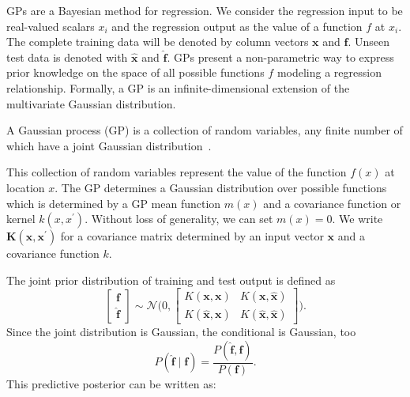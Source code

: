 \ac{GP}s are a Bayesian method for regression. We consider the regression input to be real-valued scalars $x_i$ and the regression output as the value of a function $f$ at $x_i$. The complete training data will be denoted by column vectors $\mathbf{x}$ and $\mathbf{f}$. Unseen test data is denoted with $\mathbf{\hat{x}}$ and $\mathbf{\hat{f}}$.
\ac{GP}s present a non-parametric way to express prior knowledge on the space of all possible functions $f$ modeling
a regression relationship.
Formally, a GP is an infinite-dimensional extension of the multivariate Gaussian distribution.
\begin{definition}
A Gaussian process (GP) is a collection of random variables, any
finite number of which have a joint Gaussian distribution~\citep[][chapter 2]{rasmussen2006gaussian}.
\end{definition}
This collection of random variables represent the value of the function $f(x)$ at location $x$.
The \ac{GP} determines a Gaussian distribution over possible functions 
which is determined by a \ac{GP} mean function $m(x)$ and a covariance function or kernel $k(x,x^\prime)$.
Without loss of generality, we can set $m(x)=0$. We write $\mathbf{K}(\mathbf{x},\mathbf{x}^\prime)$
for a covariance matrix determined by an input vector $\mathbf{x}$ and a covariance function $k$.
 


The joint prior distribution of training and test output is defined as 
\begin{equation}
\begin{bmatrix}
\mathbf{f} \\ 
\mathbf{\hat{f}}
\end{bmatrix}
\sim \mathcal{N}\bigg(
0,
\begin{bmatrix}
K(\mathbf{x},\mathbf{x})& K(\mathbf{x},\mathbf{\hat{x}})\\ 
K(\mathbf{\hat{x}},\mathbf{x})& K(\mathbf{\hat{x}},\mathbf{\hat{x}})
\end{bmatrix}
\bigg).
\end{equation}
Since the joint distribution is Gaussian, the conditional is Gaussian, too
\begin{equation}
\label{eq:simple_posterior}
P(\hat{\mathbf{f}} \mid \mathbf{f})  = \frac{P(\hat{\mathbf{f}}, \mathbf{f}) }{P(\mathbf{f})}.
\end{equation}
This predictive posterior can be written as:

